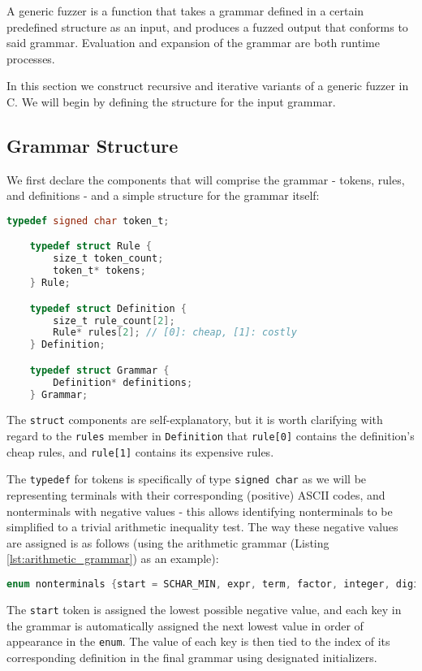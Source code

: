 \documentclass[8pt, twoside]{extarticle}
\begin{document}
A generic fuzzer is a function that takes a grammar defined in a certain predefined structure as an input, and produces a fuzzed output that conforms to said grammar. Evaluation and expansion of the grammar are both runtime processes.

In this section we construct recursive and iterative variants of a generic fuzzer in C. We will begin by defining the structure for the input grammar. 

\subsection{Grammar Structure}

We first declare the components that will comprise the grammar - tokens, rules, and definitions - and a simple structure for the grammar itself:

\begin{lstlisting}[gobble=2, language=C, caption={Generic grammar components}]
	typedef signed char token_t;

	typedef struct Rule {
		size_t token_count;
		token_t* tokens;
	} Rule;

	typedef struct Definition {
		size_t rule_count[2];
		Rule* rules[2]; // [0]: cheap, [1]: costly
	} Definition;

	typedef struct Grammar {
		Definition* definitions;
	} Grammar;
\end{lstlisting}

The \verb|struct| components are self-explanatory, but it is worth clarifying with regard to the \verb|rules| member in \verb|Definition| that \verb|rule[0]| contains the definition's cheap rules, and \verb|rule[1]| contains its expensive rules. 

The \verb|typedef| for tokens is specifically of type \verb|signed char| as we will be representing terminals with their corresponding (positive) ASCII codes, and nonterminals with negative values - this allows identifying nonterminals to be simplified to a trivial arithmetic inequality test. The way these negative values are assigned is as follows (using the arithmetic grammar (Listing \ref{lst:arithmetic_grammar}) as an example):

\begin{lstlisting}[gobble=2, language=C, caption={Defining nonterminals}] 
	enum nonterminals {start = SCHAR_MIN, expr, term, factor, integer, digit};
\end{lstlisting}

The \verb|start| token is assigned the lowest possible negative value, and each key in the grammar is automatically assigned the next lowest value in order of appearance in the \verb|enum|. The value of each key is then tied to the index of its corresponding definition in the final grammar using designated initializers.
\end{document}
